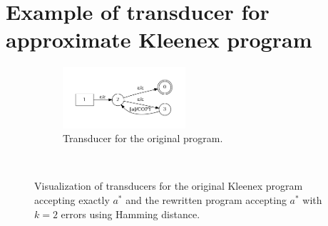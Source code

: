\section{Example of transducer for approximate Kleenex program}
\label{app:approx-kleenex-example}

\begin{figure}[!ht]
  \begin{subfigure}[t]{1\textwidth}
    \centering
    \includegraphics[width=0.5\textwidth]{images/as_exact.pdf}
    \caption{Transducer for the original program.}
  \end{subfigure}
  ~
  \noindent{}
  \caption{Visualization of transducers for the original Kleenex program
    accepting exactly $a^*$ and the rewritten program accepting $a^*$ with
    $k=2$ errors using Hamming distance.}
\end{figure}

